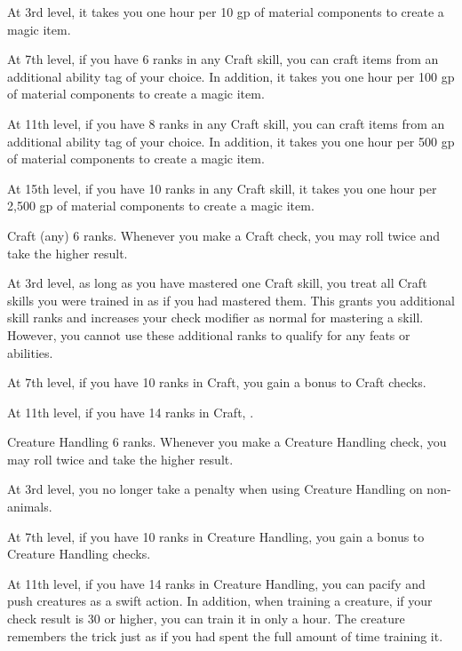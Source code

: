     At 3rd level, it takes you one hour per 10 gp of material components to create a magic item. %

    At 7th level, if you have 6 ranks in any Craft skill, you can craft items from an additional ability tag of your choice.
    In addition, it takes you one hour per 100 gp of material components to create a magic item. %

    At 11th level, if you have 8 ranks in any Craft skill, you can craft items from an additional ability tag of your choice. In addition, it takes you one hour per 500 gp of material components to create a magic item. %

    At 15th level, if you have 10 ranks in any Craft skill, it takes you one hour per 2,500 gp of material components to create a magic item. %

    \featpre Craft (any) 6 ranks.
    \featben Whenever you make a Craft check, you may roll twice and take the higher result.

    At 3rd level, as long as you have mastered one Craft skill, you treat all Craft skills you were trained in as if you had mastered them.
    This grants you additional skill ranks and increases your check modifier as normal for mastering a skill.
    However, you cannot use these additional ranks to qualify for any feats or abilities.

    At 7th level, if you have 10 ranks in Craft, you gain a  bonus to Craft checks.

    At 11th level, if you have 14 ranks in Craft, \tdash.

    \featpre Creature Handling 6 ranks.
    \featben Whenever you make a Creature Handling check, you may roll twice and take the higher result.

    At 3rd level, you no longer take a penalty when using Creature Handling on non-animals.

    At 7th level, if you have 10 ranks in Creature Handling, you gain a  bonus to Creature Handling checks.

    At 11th level, if you have 14 ranks in Creature Handling, you can pacify and push creatures as a swift action.
    In addition, when training a creature, if your check result is 30 or higher, you can train it in only a hour.
    The creature remembers the trick just as if you had spent the full amount of time training it.

